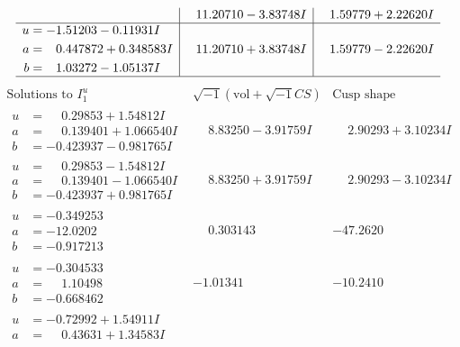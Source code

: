 \documentclass[1p]{elsarticle_modified}
\theoremstyle{definition}
\newcommand{\I}{\sqrt{-1}}
\begin{document}
$$\begin{array}{c|c|c}
 & \phantom{-}11.20710 - 3.83748 I & \phantom{-}1.59779 + 2.22620 I \\ \hline\begin{aligned}
u &= -1.51203 - 0.11931 I \\
a &= \phantom{-}0.447872 + 0.348583 I \\
b &= \phantom{-}1.03272 - 1.05137 I\end{aligned}
 & \phantom{-}11.20710 + 3.83748 I & \phantom{-}1.59779 - 2.22620 I\\
 \hline 
 \end{array}$$\newpage$$\begin{array}{c|c|c}  
\text{Solutions to }I^u_{1}& \I (\text{vol} + \sqrt{-1}CS) & \text{Cusp shape}\\
 \hline 
\begin{aligned}
u &= \phantom{-}0.29853 + 1.54812 I \\
a &= \phantom{-}0.139401 + 1.066540 I \\
b &= -0.423937 - 0.981765 I\end{aligned}
 & \phantom{-}8.83250 - 3.91759 I & \phantom{-}2.90293 + 3.10234 I \\ \hline\begin{aligned}
u &= \phantom{-}0.29853 - 1.54812 I \\
a &= \phantom{-}0.139401 - 1.066540 I \\
b &= -0.423937 + 0.981765 I\end{aligned}
 & \phantom{-}8.83250 + 3.91759 I & \phantom{-}2.90293 - 3.10234 I \\ \hline\begin{aligned}
u &= -0.349253\phantom{ +0.000000I} \\
a &= -12.0202\phantom{ +0.000000I} \\
b &= -0.917213\phantom{ +0.000000I}\end{aligned}
 & \phantom{-}0.303143\phantom{ +0.000000I} & -47.2620\phantom{ +0.000000I} \\ \hline\begin{aligned}
u &= -0.304533\phantom{ +0.000000I} \\
a &= \phantom{-}1.10498\phantom{ +0.000000I} \\
b &= -0.668462\phantom{ +0.000000I}\end{aligned}
 & -1.01341\phantom{ +0.000000I} & -10.2410\phantom{ +0.000000I} \\ \hline\begin{aligned}
u &= -0.72992 + 1.54911 I \\
a &= \phantom{-}0.43631 + 1.34583 I \\

\end{aligned}
\end{array}$$
\end{document}
